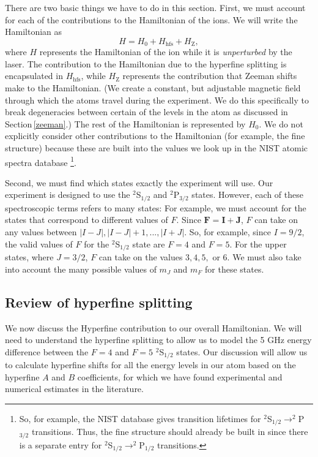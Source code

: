 There are two basic things we have to do in this section. First, we must account for each of the contributions to the Hamiltonian of the ions. We will write the Hamiltonian as 
\begin{equation}
H=H_0+H_{\mathrm{hfs}}+H_{\mathrm{Z}},\label{Hoverall}
\end{equation}
where $H$ represents the Hamiltonian of the ion while it is \emph{unperturbed} by the laser. The contribution to the Hamiltonian due to the hyperfine splitting is encapsulated in $H_{\mathrm{hfs}}$, while $H_{\mathrm{Z}}$ represents the contribution that Zeeman shifts make to the Hamiltonian. (We create a constant, but adjustable magnetic field through which the atoms travel during the experiment. We do this specifically to break degeneracies between certain of the levels in the atom as discussed in Section\,\ref{zeeman}.) The rest of the Hamiltonian is represented by $H_0$. We do not explicitly consider other contributions to the Hamiltonian (for example, the fine structure) because these are built into the values we look up in the NIST atomic spectra database \cite{NISTasd}\footnote{So, for example, the NIST database gives transition lifetimes for $^2$S$_{1/2}\rightarrow^2$P$_{3/2}$ transitions. Thus, the fine structure should already be built in since there is a separate entry for $^2$S$_{1/2}\rightarrow^2$P$_{1/2}$ transitions.}.

Second, we must find which states exactly the experiment will use.
Our experiment is designed to use the $^2$S$_{1/2}$ and $^2$P$_{3/2}$ states. However, each of these spectroscopic terms refers to many states: For example, we must account for the states that correspond to different values of $F$. Since $\mathbf{F}=\mathbf{I}+\mathbf{J}$, $F$ can take on any values between $|I-J|,|I-J|+1,...,|I+J|$. So, for example, since $I=9/2$, the valid values of $F$ for the $^2$S$_{1/2}$ state are $F=4$ and $F=5$. For the upper states, where $J=3/2$, $F$ can take on the values $3,4,5,$ or $6$. We must also take into account the many possible values of $m_J$ and $m_F$ for these states.

\subsection{Review of hyperfine splitting}

We now discuss the Hyperfine contribution to our overall Hamiltonian. We will need to understand the hyperfine splitting to allow us to model the 5 GHz energy difference between the $F=4$ and $F=5$ $^2$S$_{1/2}$ states. Our discussion will allow us to calculate hyperfine shifts for all the energy levels in our atom based on the hyperfine $A$ and $B$ coefficients, for which we have found experimental and numerical estimates in the literature.

